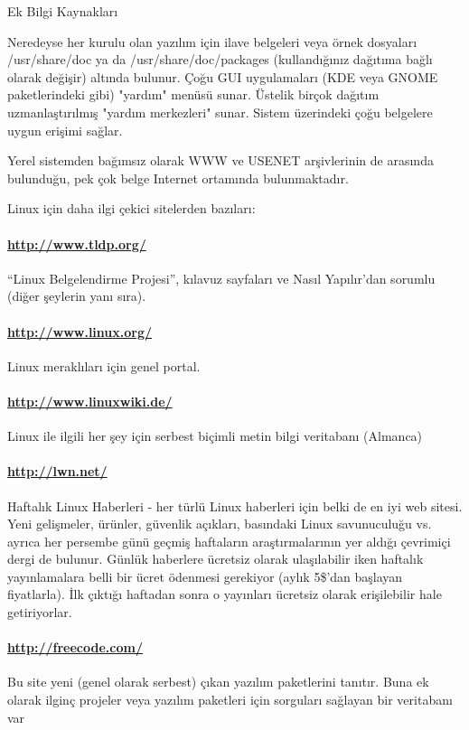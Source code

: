 \begin{section}{Ek Bilgi Kaynakları}

Neredeyse her kurulu olan yazılım için ilave belgeleri veya örnek dosyaları /usr/share/doc ya da /usr/share/doc/packages (kullandığınız dağıtıma bağlı olarak değişir) altında bulunur. Çoğu GUI uygulamaları (KDE veya GNOME paketlerindeki gibi) "yardım" menüsü sunar. Üstelik birçok dağıtım uzmanlaştırılmış "yardım merkezleri" sunar. Sistem üzerindeki çoğu belgelere uygun erişimi sağlar.

Yerel sistemden bağımsız olarak WWW ve USENET arşivlerinin de arasında bulunduğu, pek çok belge Internet ortamında bulunmaktadır. 

Linux için daha ilgi çekici sitelerden bazıları:
\paragraph{\url{http://www.tldp.org/}}{“Linux Belgelendirme Projesi”, kılavuz sayfaları ve Nasıl Yapılır'dan sorumlu (diğer şeylerin yanı sıra).}
\paragraph{\url{http://www.linux.org/}}{Linux meraklıları için genel portal.}
\paragraph{\url{http://www.linuxwiki.de/}}{Linux ile ilgili her şey için serbest biçimli metin bilgi veritabanı (Almanca)}
\paragraph{\url{http://lwn.net/}}{Haftalık Linux Haberleri - her türlü Linux haberleri için belki de en iyi web sitesi. Yeni gelişmeler, ürünler, güvenlik açıkları, basındaki Linux savunuculuğu vs. ayrıca her persembe günü geçmiş haftaların araştırmalarının yer aldığı çevrimiçi dergi de bulunur. Günlük haberlere ücretsiz olarak ulaşılabilir iken haftalık yayınlamalara belli bir ücret ödenmesi gerekiyor (aylık 5\$'dan başlayan fiyatlarla). İlk çıktığı haftadan sonra o yayınları ücretsiz olarak erişilebilir hale getiriyorlar.}
\paragraph{\url{http://freecode.com/}}{Bu site yeni (genel olarak serbest) çıkan yazılım paketlerini tanıtır. Buna ek olarak ilginç projeler veya yazılım paketleri için sorguları sağlayan bir veritabanı var}

\end{section}
